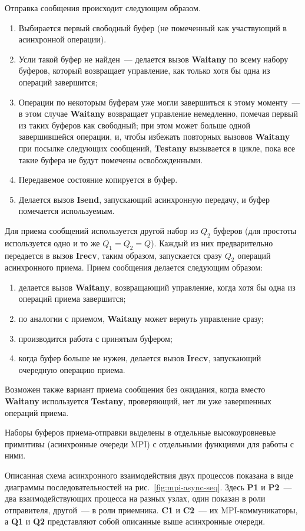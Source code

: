 \documentclass[12pt,a4paper,fleqn]{article}
\newcommand{\Code}[1]{\textbf{\mbox{#1}}}
\begin{document}
Отправка сообщения происходит следующим образом.
\begin{enumerate}
\item Выбирается первый свободный буфер (не помеченный как участвующий в асинхронной
  операции).
\item Усли такой буфер не найден~--- делается вызов \Code{Waitany} по всему набору
  буферов, который возвращает управление, как только хотя бы одна из операций завершится;
\item Операции по некоторым буферам уже могли завершиться к этому моменту~--- в этом
  случае \Code{Waitany} возвращает управление немедленно, помечая первый из таких буферов
  как свободный; при этом может больше одной завершившейся операции, и, чтобы избежать
  повторных вызовов \Code{Waitany} при посылке следующих сообщений, \Code{Testany}
  вызывается в цикле, пока все такие буфера не будут помечены освобожденными.
\item Передавемое состояние копируется в буфер.
\item Делается вызов \Code{Isend}, запускающий асинхронную передачу, и буфер помечается
  используемым.
\end{enumerate}

Для приема сообщений используется другой набор из $Q_2$ буферов (для простоты используется
одно и то же $Q_1 = Q_2 = Q$). Каждый из них предварительно передается в вызов
\Code{Irecv}, таким образом, запускается сразу $Q_2$ операций асинхронного приема. Прием
сообщения делается следующим образом:
\begin{enumerate}
\item делается вызов \Code{Waitany}, возвращающий управление, когда хотя бы одна из
  операций приема завершится;
\item по аналогии с приемом, \Code{Waitany} может вернуть управление сразу;
\item производится работа с принятым буфером;
\item когда буфер больше не нужен, делается вызов \Code{Irecv}, запускающий очередную
  операцию приема.
\end{enumerate}

Возможен также вариант приема сообщения без ожидания, когда вместо \Code{Waitany} используется
\Code{Testany}, проверяющий, нет ли уже завершенных операций приема.

Наборы буферов приема-отправки выделены в отдельные высокоуровневые примитивы (асинхронные
очереди MPI) с отдельными функциями для работы с ними.

Описанная схема асинхронного взаимодействия двух процессов показана в виде диаграммы
последовательностей на рис.~\ref{fig:mpi-async-seq}. Здесь \Code{P1} и \Code{P2}~--- два
взаимодействующих процесса на разных узлах, один показан в роли отправителя, другой~--- в роли
приемника. \Code{C1} и \Code{C2}~--- их MPI-коммуникаторы, а \Code{Q1} и \Code{Q2} представляют
собой описанные выше асинхронные очереди.
\end{document}
